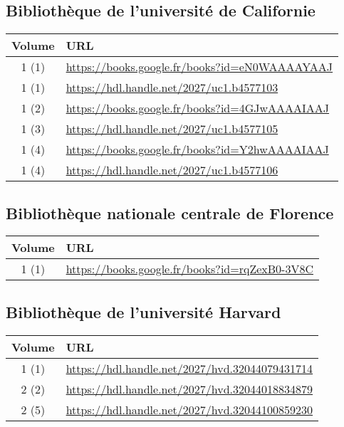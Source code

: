 \subsection{Bibliothèque de l'université de Californie}
\begin{center}
\begin{tabular}{ | c | p{13cm} | }
\hline
Volume & URL \\ \hline
1 (1) & \url{https://books.google.fr/books?id=eN0WAAAAYAAJ} \\ \hline
1 (1) & \url{https://hdl.handle.net/2027/uc1.b4577103} \\ \hline
1 (2) & \url{https://books.google.fr/books?id=4GJwAAAAIAAJ} \\ \hline
1 (3) & \url{https://hdl.handle.net/2027/uc1.b4577105} \\ \hline
1 (4) & \url{https://books.google.fr/books?id=Y2hwAAAAIAAJ} \\ \hline
1 (4) & \url{https://hdl.handle.net/2027/uc1.b4577106} \\ \hline
\end{tabular}
\end{center}

\subsection{Bibliothèque nationale centrale de Florence}
\begin{center}
\begin{tabular}{ | c | p{13cm} | }
\hline
Volume & URL \\ \hline
1 (1) & \url{https://books.google.fr/books?id=rqZexB0-3V8C} \\ \hline
\end{tabular}
\end{center}

\subsection{Bibliothèque de l'université Harvard}
\begin{center}
\begin{tabular}{ | c | p{13cm} | }
\hline
Volume & URL \\ \hline
1 (1) & \url{https://hdl.handle.net/2027/hvd.32044079431714} \\ \hline
2 (2) & \url{https://hdl.handle.net/2027/hvd.32044018834879} \\ \hline
2 (5) & \url{https://hdl.handle.net/2027/hvd.32044100859230} \\ \hline
\end{tabular}
\end{center}

